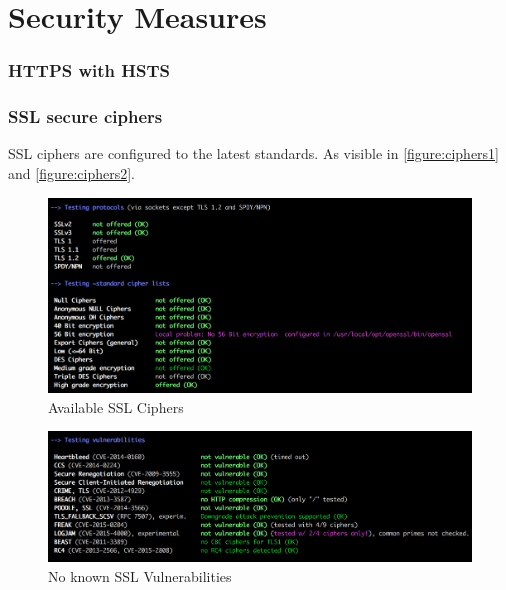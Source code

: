 \chapter{Security Measures}\label{chapter:security_measures}


\subsection{HTTPS with HSTS}

\subsection{SSL secure ciphers}
SSL ciphers are configured to the latest standards. As visible in \autoref{figure:ciphers1} and \autoref{figure:ciphers2}.
\begin{figure}[h!tbp]
	\centering
	\includegraphics[width=\textwidth]{figures/ciphers1.png}
	\caption{Available SSL Ciphers}
	\label{figure:ciphers1}
\end{figure}
\begin{figure}[h!tbp]
	\centering
	\includegraphics[width=\textwidth]{figures/ciphers2.png}
	\caption{No known SSL Vulnerabilities}
	\label{figure:ciphers2}
\end{figure}


